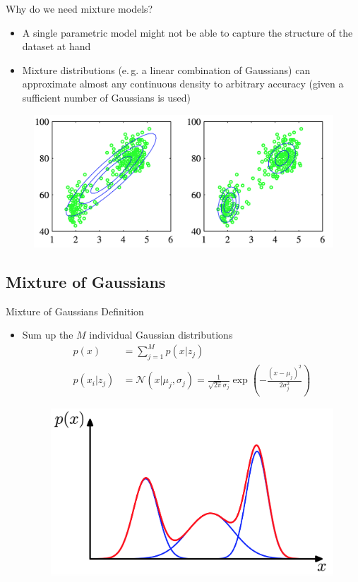\begin{frame}{Why do we need mixture models?}{}
	\begin{itemize}
		\item A single parametric model might not be able to capture the structure of the dataset at hand
		\item Mixture distributions (e.\,g. a linear combination of Gaussians) can approximate almost any continuous density to arbitrary accuracy (given a sufficient number of Gaussians is used)
	\end{itemize}
	\begin{figure}
		\centering
		\includegraphics[scale=0.30]{04_density_estimation/02_img/mixturemodels_oldfaithful.png}
	\end{figure}
\end{frame}

\subsection{Mixture of Gaussians}
\begin{frame}{Mixture of Gaussians Definition}{}
	\begin{itemize}
		\item Sum up the $M$ individual Gaussian distributions
		\begin{align}
			p(x) &= \sum_{j=1}^M p(x|z_j)\\
			p(x_i|z_j) &= \mathcal{N}(x|\mu_j, \sigma_j) = \frac{1}{\sqrt{2\pi}\sigma_j} \exp\left(-\frac{(x - \mu_j)^2}{2\sigma_j^2}\right)
		\end{align}
		\begin{figure}
			\centering
			\includegraphics[scale=0.20]{04_density_estimation/02_img/gaussianmixturedistribution}
		\end{figure}
	\end{itemize}
\end{frame}

